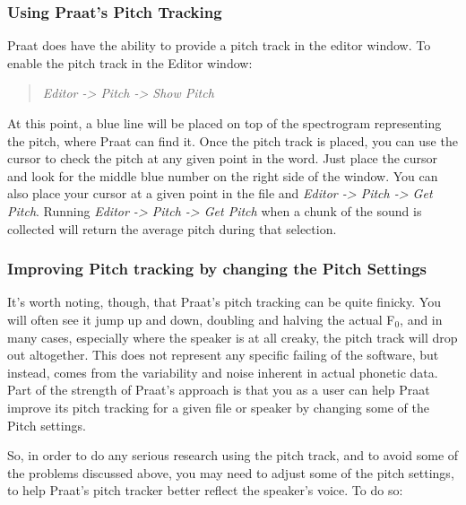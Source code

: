 \documentclass[11pt]{article}
\begin{document}
\hypertarget{using-praats-pitch-tracking}{%
\subsubsection{Using Praat's Pitch
Tracking}\label{using-praats-pitch-tracking}}

\label{pitchtracking} Praat does have the ability to provide a pitch
track in the editor window. To enable the pitch track in the Editor
window:

\begin{quote}
\emph{Editor -\textgreater{} Pitch -\textgreater{} Show Pitch}
\end{quote}

At this point, a blue line will be placed on top of the spectrogram
representing the pitch, where Praat can find it. Once the pitch track is
placed, you can use the cursor to check the pitch at any given point in
the word. Just place the cursor and look for the middle blue number on
the right side of the window. You can also place your cursor at a given
point in the file and \emph{Editor -\textgreater{} Pitch -\textgreater{}
Get Pitch}. Running \emph{Editor -\textgreater{} Pitch -\textgreater{}
Get Pitch} when a chunk of the sound is collected will return the
average pitch during that selection.

\hypertarget{improving-pitch-tracking-by-changing-the-pitch-settings}{%
\subsubsection{Improving Pitch tracking by changing the Pitch
Settings}\label{improving-pitch-tracking-by-changing-the-pitch-settings}}

It's worth noting, though, that Praat's pitch tracking can be quite
finicky. You will often see it jump up and down, doubling and halving
the actual F$_{0}$, and in many cases, especially where the speaker is at all
creaky, the pitch track will drop out altogether. This does not
represent any specific failing of the software, but instead, comes from
the variability and noise inherent in actual phonetic data. Part of the
strength of Praat's approach is that you as a user can help Praat
improve its pitch tracking for a given file or speaker by changing some
of the Pitch settings.

So, in order to do any serious research using the pitch track, and to
avoid some of the problems discussed above, you may need to adjust some
of the pitch settings, to help Praat's pitch tracker better reflect the
speaker's voice. To do so:
\end{document}
